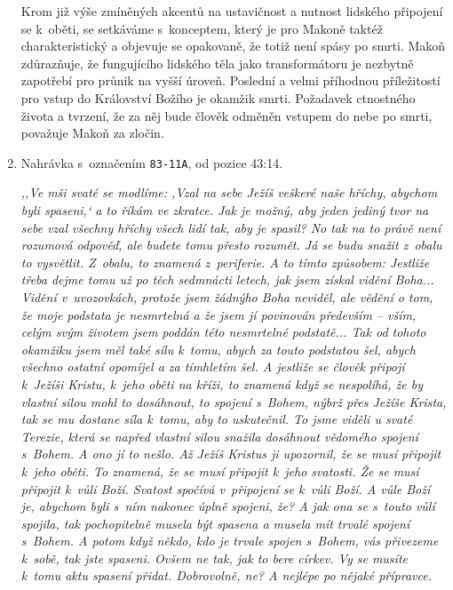 \begin{enumerate}
{Krom již výše zmíněných akcentů na ustavičnost a nutnost lidského připojení se
        k~oběti, se setkáváme s~konceptem, který je pro Makoně taktéž
        charakteristický a objevuje se opakovaně, že totiž není spásy po smrti.
        Makoň zdůrazňuje, že fungujícího lidského těla jako transformátoru je
        nezbytně zapotřebí pro průnik na vyšší úroveň. Poslední a velmi
        příhodnou příležitostí pro vstup do Království Božího je okamžik smrti.
        Požadavek ctnostného života a tvrzení, že za něj bude člověk odměněn
        vstupem do nebe po smrti, považuje Makoň za zločin.

}

\item{
Nahrávka s~označením \texttt{83-11A}, od pozice 43:14.

\textit{%
,,Ve mši svaté se modlíme: ,Vzal na sebe Ježíš veškeré naše hříchy, abychom byli
spaseni,` a to říkám ve zkratce. Jak je možný, aby jeden jediný tvor na sebe
vzal všechny hříchy všech lidí tak, aby je spasil? No tak na to právě není
rozumová odpověď, ale budete tomu přesto rozumět. Já se budu snažit z~obalu to
vysvětlit. Z~obalu, to znamená z~periferie. A to tímto způsobem: Jestliže třeba
dejme tomu už po těch sedmnácti letech, jak jsem získal vidění Boha... Vidění
v~uvozovkách, protože jsem žádnýho Boha neviděl, ale vědění o tom, že moje
podstata je nesmrtelná a že jsem jí povinován především -- vším, celým svým
životem jsem poddán této nesmrtelné podstatě... Tak od tohoto okamžiku jsem měl
také sílu k~tomu, abych za touto podstatou šel, abych všechno ostatní opomíjel a
za tímhletím šel. A jestliže se člověk připojí k~Ježíši Kristu, k~jeho oběti na
kříži, to znamená když se nespolíhá, že by vlastní silou mohl to dosáhnout, to
spojení s~Bohem, nýbrž přes Ježíše Krista, tak se mu dostane síla k~tomu, aby to
uskutečnil. To jsme viděli u svaté Terezie, která se napřed vlastní silou
snažila dosáhnout vědomého spojení s~Bohem. A ono jí to nešlo. Až Ježíš Kristus
ji upozornil, že se musí připojit k~jeho oběti. To znamená, že se musí připojit
k~jeho svatosti. Že se musí připojit k~vůli Boží. Svatost spočívá v~připojení se
k~vůli Boží. A vůle Boží je, abychom byli s~ním nakonec úplně spojeni, že? A jak
ona se s~touto vůlí spojila, tak pochopitelně musela být spasena a musela mít
trvalé spojení s~Bohem. A potom když někdo, kdo je trvale spojen s~Bohem, vás
přivezeme k~sobě, tak jste spaseni. Ovšem ne tak, jak to bere církev. Vy se
musíte k~tomu aktu spasení přidat. Dobrovolně, ne? A nejlépe po nějaké přípravce.
}}
\end{enumerate}
